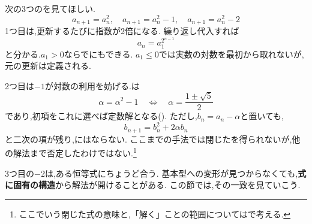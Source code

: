 次の3つのを見てほしい.
\[
  a_{n+1}=a_n^2,
  \quad
  a_{n+1}=a_n^2-1,
  \quad
  a_{n+1}=a_n^2-2
\]
1つ目は,更新するたびに指数が2倍になる.
繰り返し代入すれば
\[
  a_n=a_1^{2^{n-1}}
\]
と分かる.$a_1>0$ならでにもできる.
$a_1\le0$では実数の対数を最初から取れないが,元の更新は定義される.

2つ目は$-1$が対数の利用を妨げる.は
\[
  \alpha=\alpha^2-1
  \quad\Longleftrightarrow\quad
  \alpha=\frac{1\pm\sqrt5}{2}
\]
であり,初項をこれに選べば定数解となる().
ただし,$b_n=a_n-\alpha$と置いても,
\[
  b_{n+1}=b_n^2+2\alpha b_n
\]
と二次の項が残り,にはならない.
ここまでの手法では閉じたを得られないが,他の解法まで否定したわけではない.\footnote{ここでいう閉じた式の意味と,「解く」ことの範囲についてはで考える.}

3つ目の$-2$は,ある恒等式にちょうど合う.
基本型への変形が見つからなくても,\textbf{式に固有の構造}から解法が開けることがある.
この節では,その一致を見ていこう.
